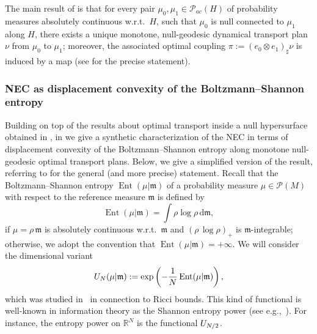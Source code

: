 \documentclass[12pt,a4paper]{amsart}
\theoremstyle{plain}
\theoremstyle{definition}
\numberwithin{equation}{section}
\newcommand{\R}{\mathbb{R}}
\DeclareMathOperator{\Ent}{Ent}
\newcommand{\de}{{\mathrm{d}}}
\newcommand{\Prob}{\mathcal P}
\newcommand{\mm}{\mathfrak m}
\begin{document}
The main result of  is that for every pair  $\mu_0,\mu_1\in \Prob_{ac}(H)$ of probability measures absolutely continuous w.r.t.\ $H$, such that  $\mu_0$ is null connected to $\mu_1$ along $H$, there exists a unique monotone, null-geodesic dynamical transport plan $\nu$ from $\mu_0$ to $\mu_1$; moreover, the associated optimal coupling  $\pi:=(e_0\otimes e_1)_{\sharp}\nu$ is induced by a map (see  for the precise statement). 



\subsubsection*{\textbf{NEC as displacement convexity of the Boltzmann--Shannon entropy}}
Building on top of the results about optimal transport inside a null hypersurface 
obtained in , in  we  give a synthetic characterization of the NEC  in terms of displacement convexity of the Boltzmann--Shannon entropy along monotone  null-geodesic optimal transport plans. Below, we give a simplified version of the result, referring to  for the general (and more precise) statement. Recall that the Boltzmann--Shannon entropy $\Ent(\mu|\mm)$ of a probability measure $\mu\in \Prob(M)$ with respect to the reference measure $\mm$ is defined by
\begin{equation*}%
\Ent(\mu|\mm)=\int \rho \log \rho \, \de\mm,
\end{equation*}
if $\mu=\rho\,\mm$ is absolutely continuous w.r.t.\ $\mm$ and $\left(\rho\, \log \rho\right)_+$ is $\mm$-integrable; otherwise, we adopt the convention that $\Ent(\mu|\mm)=+\infty$. We will consider the dimensional variant 
\begin{equation*}%
{\rm U}_N(\mu|\mm):=\exp\left(-\frac{1}{N}\Ent(\mu|\mm) \right),
\end{equation*}
which was studied in~\cite{EKS} in connection to Ricci bounds. This kind of functional is well-known in information theory as the
Shannon entropy power (see e.g.,~\cite{DCT-1991}).
For instance, the entropy power on $\R^N$ is the functional ${\rm U}_{N/2}$.
\end{document}
